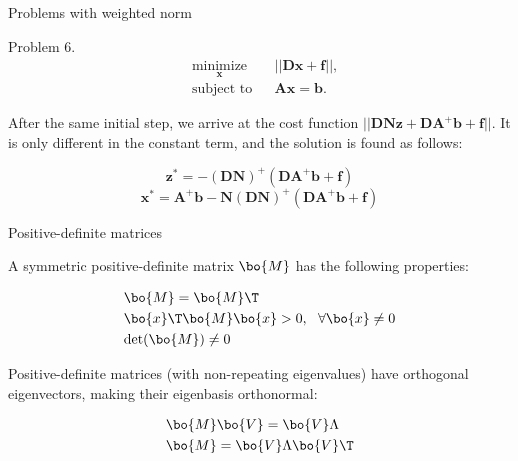 \documentclass{beamer}
\begin{document}
\begin{frame}{Problems with weighted norm}
	\begin{flushleft}
		
		Problem 6. 
		\begin{equation}
			\begin{aligned}
				& \underset{\mathbf{x}}{\text{minimize}}
				& & || \mathbf{D}\mathbf{x} + \mathbf{f} ||, \\
				& \text{subject to}
				& & \mathbf{A} \mathbf{x} = \mathbf{b}.
			\end{aligned}
		\end{equation}
		
		After the same initial step, we arrive at the cost function $|| \mathbf{D}\mathbf{N}\mathbf{z} + \mathbf{D}\mathbf{A}^+\mathbf{b} + \mathbf{f}||$. It is only different in the constant term, and the solution is found as follows:
		
		
		\begin{equation}
			\mathbf{z}^* = -(\mathbf{D}\mathbf{N})^+ (\mathbf{D}\mathbf{A}^+\mathbf{b} + \mathbf{f})
		\end{equation}
		\begin{equation}
			\mathbf{x}^* = \mathbf{A}^+\mathbf{b}-\mathbf{N}(\mathbf{D}\mathbf{N})^+ (\mathbf{D}\mathbf{A}^+\mathbf{b} + \mathbf{f})
		\end{equation}
		
		
	\end{flushleft}
\end{frame}




\begin{frame}{Positive-definite matrices}
	\begin{flushleft}
		
		A symmetric positive-definite matrix $\bo{M}$ has the following properties:
		
		\begin{align}
			&\bo{M} = \bo{M}\T
			\\
			&\bo{x}\T \bo{M} \bo{x} > 0, \ \ \forall \bo{x} \neq 0
			\\
			& \text{det}(\bo{M}) \neq 0
		\end{align}
		
		Positive-definite matrices (with non-repeating eigenvalues) have orthogonal eigenvectors, making their eigenbasis orthonormal:
		
		\begin{align}
			& \bo{M} \bo{V} = \bo{V} \Lambda  
			\\
			& \bo{M} = \bo{V} \Lambda \bo{V}\T 
		\end{align}
		
	\end{flushleft}
\end{frame}
\end{document}
